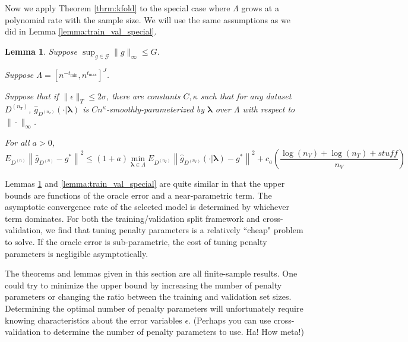 \documentclass[12pt]{article}
\newtheorem{lemma}{Lemma}
\begin{document}
Now we apply Theorem \ref{thrm:kfold} to the special case where $\Lambda$ grows at a polynomial rate with the sample size. We will use the same assumptions as we did in Lemma \ref{lemma:train_val_special}.

\begin{lemma}
	\label{lemma:kfold_special}
Suppose $\sup_{g \in \mathcal{G}} \|g\|_\infty \le G$.

Suppose $\Lambda = [n^{-t_{\min}}, n^{t_{\max}}]^J$.

Suppose that if $\|\epsilon\|_{T}\le 2\sigma$, there are constants $C,\kappa$ such that for any dataset $D^{(n_T)}$, $\hat{g}_{D^{(n_T)}}(\cdot | \boldsymbol \lambda)$ is $Cn^\kappa$-smoothly-parameterized by $\boldsymbol \lambda$ over $\Lambda$ with respect to $\| \cdot \|_\infty$.

For all $a > 0$,
\begin{equation}
E_{D^{(n)}} \left \| \bar{g}_{D^{(n)}} - g^* \right \|^2 \le
(1+a) \min_{\boldsymbol{\lambda} \in \Lambda}  E_{D^{(n_T)}} \left \| \hat{g}_{D^{(n_T)}}(\cdot |\boldsymbol \lambda) - g^* \right \|^2
+  c_a \left (\frac{\log(n_V) + \log(n_T) + stuff}{n_V}\right )
\end{equation}
\end{lemma}
Lemmas \ref{lemma:kfold_special} and \ref{lemma:train_val_special} are quite similar in that the upper bounds are functions of the oracle error and a near-parametric term. The asymptotic convergence rate of the selected model is determined by whichever term dominates. For both the training/validation split framework and cross-validation, we find that tuning penalty parameters is a relatively ``cheap" problem to solve. If the oracle error is sub-parametric, the cost of tuning penalty parameters is negligible asymptotically.

The theorems and lemmas given in this section are all  finite-sample results. One could try to minimize the upper bound by increasing the number of penalty parameters or changing the ratio between the training and validation set sizes. Determining the optimal number of penalty parameters will unfortunately require knowing characteristics about the error variables $\epsilon$. (Perhaps you can use cross-validation to determine the number of penalty parameters to use. Ha! How meta!)


\end{document}
